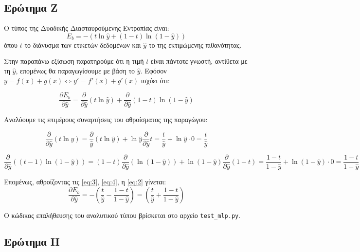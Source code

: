 \documentclass{article}
\newcommand{\code}{\texttt}
\begin{document}
\subsection{Ερώτημα Ζ}

Ο τύπος της Δυαδικής Διασταυρούμενης Εντροπίας είναι:
\begin{equation}
	\label{eq:1}
	E_{b} = -(t \ln \hat{y} + (1-t) \ln(1-\hat{y}))
\end{equation}
όπου $t$ το διάνυσμα των ετικετών δεδομένων και $\hat{y}$ το της εκτιμώμενης πιθανότητας.

Στην παραπάνω εξίσωση παρατηρούμε ότι η τιμή $t$ είναι πάντοτε γνωστή, αντίθετα με τη $\hat{y}$, επομένως θα παραγωγίσουμε με βάση το $\hat{y}$. Εφόσον $y = f(x) + g(x) \iff y' = f'(x) + g'(x)$ ισχύει ότι:

\begin{equation}
	\label{eq:2}
	\frac{\partial E_b}{\partial \hat{y}} = \frac{\partial}{\partial \hat{y}} (t\ln \hat{y}) + \frac{\partial}{\partial \hat{y}} (1-t) \ln (1-\hat{y})
\end{equation}

Αναλύουμε τις επιμέρους συναρτήσεις του αθροίσματος της παραγώγου:

\begin{equation}
	\label{eq:3}
	\frac{\partial}{\partial \hat{y}} (t \ln\hat{y}) = \frac{\partial }{\hat{y}} (t\ln\hat{y}) + \ln\hat{y} \frac{\partial}{\partial \hat{y}}t = \frac{t}{\hat{y}} + \ln \hat{y} \cdot 0 = \frac{t}{\hat{y}}
\end{equation}

\begin{equation}
	\label{eq:4}
	\frac{\partial}{\partial \hat{y}} ((t-1) \ln(1-\hat{y})) = (1-t)\frac{\partial}{\partial\hat{y}} (\ln(1-\hat{y})) + \ln(1-\hat{y}) \frac{\partial}{\partial \hat{y}}(1-t) = \frac{1-t}{1-\hat{y}} + \ln(1-\hat{y}) \cdot 0 =\frac{1-t}{1-\hat{y}}
\end{equation}


Επομένως, αθροίζοντας τις \ref{eq:3}, \ref{eq:4}, η \ref{eq:2} γίνεται:
\begin{equation}
	\frac{\partial E_b}{\partial \hat{y}} = - (\frac{t}{\hat{y}} - \frac{1-t}{1-\hat{y}}) = (\frac{t}{\hat{y}} + \frac{1-t}{1 - \hat{y}})
\end{equation}

Ο κώδικας επαλήθευσης του αναλυτικού τύπου βρίσκεται στο αρχείο \code{test\_mlp.py}.


\subsection{Ερώτημα Η}
\end{document}
